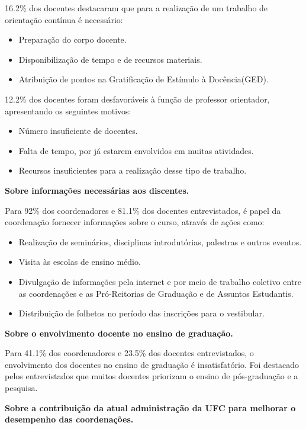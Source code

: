 \documentclass{report}
\begin{document}
16.2\% dos docentes destacaram que para a realização de um trabalho de orientação contínua é necessário:

\begin{itemize}
\item Preparação do corpo docente.
\item Disponibilização de tempo e de recursos materiais.
\item Atribuição de pontos na Gratificação de Estímulo à Docência(GED).
\end{itemize}

12.2\% dos docentes foram desfavoráveis à função de professor orientador, apresentando os seguintes motivos:

\begin{itemize}
\item Número insuficiente de docentes.
\item Falta de tempo, por já estarem envolvidos em muitas atividades.
\item Recursos insuficientes para a realização desse tipo de trabalho.
\end{itemize}

\textbf{Sobre informações necessárias aos discentes.}

Para 92\% dos coordenadores e 81.1\% dos docentes entrevistados, é papel da coordenação fornecer informações sobre o curso, através de ações como:

\begin{itemize}
\item Realização de seminários, disciplinas introdutórias, palestras e outros eventos.
\item Visita às escolas de ensino médio.
\item Divulgação de informações pela internet e por meio de trabalho coletivo entre as coordenações e as Pró-Reitorias de Graduação e de Assuntos Estudantis.
\item Distribuição de folhetos no período das inscrições para o vestibular.
\end{itemize}

\textbf{Sobre o envolvimento docente no ensino de graduação.}

Para 41.1\% dos coordenadores e 23.5\% dos docentes entrevistados, o envolvimento dos docentes no ensino de graduação é insatisfatório. Foi destacado pelos entrevistados que muitos docentes priorizam o ensino de pós-graduação e a pesquisa.

\textbf{Sobre a contribuição da atual administração da UFC para melhorar o desempenho das coordenações.}
\end{document}
